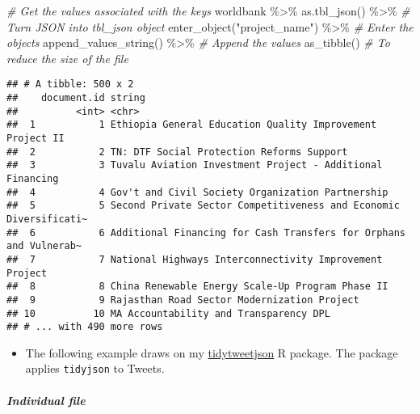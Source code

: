 \documentclass[
]{book}
\newenvironment{Shaded}{\begin{snugshade}}{\end{snugshade}}
\newcommand{\CommentTok}[1]{\textcolor[rgb]{0.56,0.35,0.01}{\textit{#1}}}
\newcommand{\FunctionTok}[1]{\textcolor[rgb]{0.00,0.00,0.00}{#1}}
\newcommand{\NormalTok}[1]{#1}
\newcommand{\SpecialCharTok}[1]{\textcolor[rgb]{0.00,0.00,0.00}{#1}}
\newcommand{\StringTok}[1]{\textcolor[rgb]{0.31,0.60,0.02}{#1}}
\providecommand{\tightlist}{%
  \setlength{\itemsep}{0pt}\setlength{\parskip}{0pt}}
\begin{document}
\begin{Shaded}
\begin{Highlighting}[]
\CommentTok{\# Get the values associated with the keys }
\NormalTok{worldbank }\SpecialCharTok{\%\textgreater{}\%} 
  \FunctionTok{as.tbl\_json}\NormalTok{() }\SpecialCharTok{\%\textgreater{}\%} \CommentTok{\# Turn JSON into tbl\_json object }
  \FunctionTok{enter\_object}\NormalTok{(}\StringTok{"project\_name"}\NormalTok{) }\SpecialCharTok{\%\textgreater{}\%} \CommentTok{\# Enter the objects }
  \FunctionTok{append\_values\_string}\NormalTok{() }\SpecialCharTok{\%\textgreater{}\%} \CommentTok{\# Append the values }
  \FunctionTok{as\_tibble}\NormalTok{() }\CommentTok{\# To reduce the size of the file }
\end{Highlighting}
\end{Shaded}

\begin{verbatim}
## # A tibble: 500 x 2
##    document.id string                                                           
##          <int> <chr>                                                            
##  1           1 Ethiopia General Education Quality Improvement Project II        
##  2           2 TN: DTF Social Protection Reforms Support                        
##  3           3 Tuvalu Aviation Investment Project - Additional Financing        
##  4           4 Gov't and Civil Society Organization Partnership                 
##  5           5 Second Private Sector Competitiveness and Economic Diversificati~
##  6           6 Additional Financing for Cash Transfers for Orphans and Vulnerab~
##  7           7 National Highways Interconnectivity Improvement Project          
##  8           8 China Renewable Energy Scale-Up Program Phase II                 
##  9           9 Rajasthan Road Sector Modernization Project                      
## 10          10 MA Accountability and Transparency DPL                           
## # ... with 490 more rows
\end{verbatim}

\begin{itemize}
\tightlist
\item
  The following example draws on my \href{https://github.com/jaeyk/tidytweetjson}{tidytweetjson} R package. The package applies \texttt{tidyjson} to Tweets.
\end{itemize}

\hypertarget{individual-file}{%
\subparagraph{Individual file}\label{individual-file}}
\end{document}
